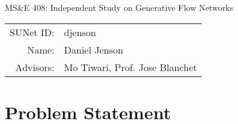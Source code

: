 \documentclass[12pt]{article}
\begin{document}
\begin{center}
  {\Large MS\&E 408: Independent Study on Generative Flow Networks}

	\begin{tabular}{rl}
		SUNet ID:      & djenson                            \\
		Name:          & Daniel Jenson                      \\
		Advisors: & Mo Tiwari, Prof. Jose Blanchet
	\end{tabular}
\end{center}

\section*{Problem Statement}
\end{document}
